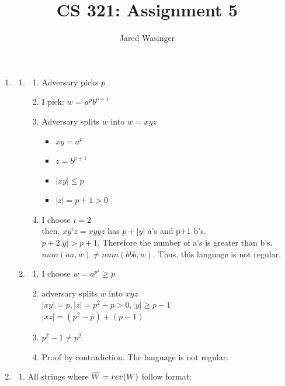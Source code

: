 \documentclass{article}
\newcommand{\overbar}[1]{\mkern 1.5mu\overline{\mkern-1.5mu#1\mkern-1.5mu}\mkern 1.5mu}
\begin{document}
  \title{CS 321: Assignment 5}
  \author{Jared Wasinger}

  \maketitle

	\begin{enumerate}
		\item\begin{enumerate}
			\item\begin{enumerate}
				\item Adversary picks $p$
				\item I pick: $w$ = $a^pb^{p+1}$\\
				\item Adversary splits $w$ into $w=xyz$
					\begin{itemize}
						\item $xy = a^{p}$ 
						\item$z=b^{p+1}$
						\item$|xy| \leq p$
						\item$|z| = p+1 > 0$
					\end{itemize}
			  \item I choose $i = 2$\\
					then, $xy^iz = xyyz$ has $p + |y|$ a's and p+1 b's.\\
					$p+2|y| > p+1$.  Therefore the number of a's is greater than b's.  $num(aa,w) \neq num(bbb,w)$. Thus, this language is not regular.
				\end{enumerate}
			\item\begin{enumerate}
				\item I choose $w = a^{p^2} \geq p$
				\item adversary splits $w$ into $xyz$\\
					$|xy| = p, |z| = p^2 - p > 0, |y| \geq p - 1$\\
					$|xz| = (p^2 - p) + (p - 1)$\\
				\item $p^2 - 1 \neq p^2$
				\item Proof by contradiction.  The language is not regular.
				\end{enumerate}
			\end{enumerate}
		\item\begin{enumerate}
		  \item 
				All strings where $\overbar{W} = rev(W)$  follow format:\\

\end{enumerate}
\end{enumerate}
\end{document}
